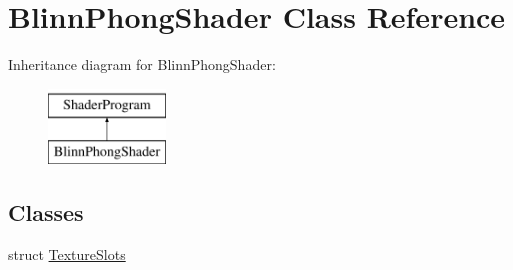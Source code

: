 \hypertarget{class_blinn_phong_shader}{}\section{Blinn\+Phong\+Shader Class Reference}
\label{class_blinn_phong_shader}
Inheritance diagram for Blinn\+Phong\+Shader\+:\begin{figure}[H]
\begin{center}
\leavevmode
\includegraphics[height=2.000000cm]{class_blinn_phong_shader}
\end{center}
\end{figure}
\subsection*{Classes}
\begin{DoxyCompactItemize}
\item 
struct \hyperlink{struct_blinn_phong_shader_1_1_texture_slots}{Texture\+Slots}
\end{DoxyCompactItemize}
